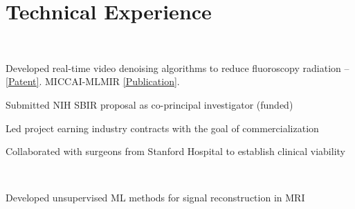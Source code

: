 \documentclass[]{deedy-resume-openfont}
\begin{document}
\hfill
\begin{minipage}[t]{0.68\textwidth} 


\section{Technical Experience}

\\
\vspace{\topsep}
\begin{tightemize}
\item Developed real-time video denoising algorithms to reduce fluoroscopy radiation
    \subitem -- \href{https://patentscope.wipo.int/search/en/detail.jsf?docId=WO2021163022&tab=PCTBIBLIO}{[\underline{Patent}]}. MICCAI-MLMIR \href{https://link.springer.com/chapter/10.1007/978-3-030-88552-6_11}{[\underline{Publication}]}.
\item Submitted NIH SBIR proposal as co-principal investigator (funded)
\item Led project earning industry contracts with the goal of commercialization
\item Collaborated with surgeons from Stanford Hospital to establish clinical viability
\end{tightemize}
\sectionsep

\\
\vspace{-1mm}
\begin{tightemize}
\item Developed unsupervised ML methods for signal reconstruction in MRI
\end{tightemize}
\sectionsep


\end{minipage}
\end{document}
